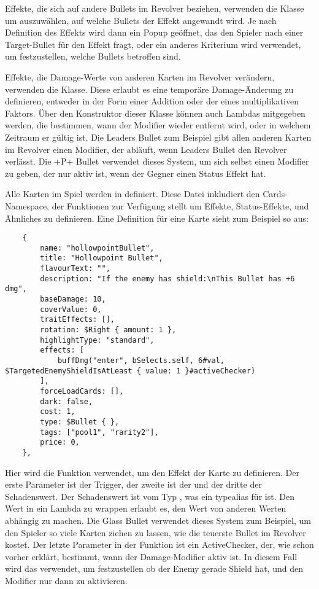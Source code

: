 Effekte, die sich auf andere Bullets im Revolver beziehen, verwenden die  Klasse um
auszuwählen, auf welche Bullets der Effekt angewandt wird.
Je nach Definition des Effekts wird dann ein Popup geöffnet, das den Spieler nach einer Target-Bullet für den Effekt
fragt, oder ein anderes Kriterium wird verwendet, um festzustellen, welche Bullets betroffen sind.

Effekte, die Damage-Werte von anderen Karten im Revolver verändern, verwenden die 
Klasse.
Diese erlaubt es eine temporäre Damage-Änderung zu definieren, entweder in der Form einer Addition oder der eines
multiplikativen Faktors.
Über den Konstruktor dieser Klasse können auch Lambdas mitgegeben werden, die bestimmen, wann der Modifier wieder
entfernt wird, oder in welchem Zeitraum er gültig ist.
Die Leaders Bullet zum Beispiel gibt allen anderen Karten im Revolver einen Modifier, der abläuft, wenn Leaders Bullet
den Revolver verlässt.
Die +P+ Bullet verwendet dieses System, um sich selbst einen Modifier zu geben, der nur aktiv ist, wenn der Gegner einen
Status Effekt hat.

Alle Karten im Spiel werden in  definiert.
Diese Datei inkludiert den Cards-Namespace, der Funktionen zur Verfügung stellt um Effekte, Status-Effekte, und
Ähnliches zu definieren.
Eine Definition für eine Karte sieht zum Beispiel so aus:

\begin{verbatim}
    {
        name: "hollowpointBullet",
        title: "Hollowpoint Bullet",
        flavourText: "",
        description: "If the enemy has shield:\nThis Bullet has +6 dmg",
        baseDamage: 10,
        coverValue: 0,
        traitEffects: [],
        rotation: $Right { amount: 1 },
        highlightType: "standard",
        effects: [
            buffDmg("enter", bSelects.self, 6#val, $TargetedEnemyShieldIsAtLeast { value: 1 }#activeChecker)
        ],
        forceLoadCards: [],
        dark: false,
        cost: 1,
        type: $Bullet { },
        tags: ["pool1", "rarity2"],
        price: 0,
    },
\end{verbatim}

Hier wird die  Funktion verwendet, um den Effekt der Karte zu definieren.
Der erste Parameter ist der Trigger, der zweite ist der  und der dritte der Schadenswert.
Der Schadenswert ist vom Typ , was ein typealias für
 ist.
Den Wert in ein Lambda zu wrappen erlaubt es, den Wert von anderen Werten abhängig zu machen.
Die Glass Bullet verwendet dieses System zum Beispiel, um den Spieler so viele Karten ziehen zu lassen, wie die teuerste
Bullet im Revolver kostet.
Der letzte Parameter in der  Funktion ist ein ActiveChecker, der, wie schon vorher erklärt,
bestimmt, wann der Damage-Modifier aktiv ist.
In diesem Fall wird das   verwendet, um
festzustellen ob der Enemy gerade Shield hat, und den Modifier nur dann zu aktivieren.

\renewcommand{\kapitelautor}{}
